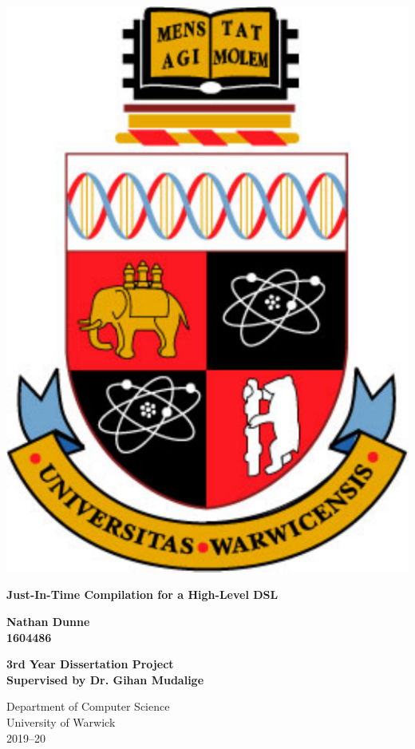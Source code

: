 
\thispagestyle{empty}

\begin{spacing}{2}
	\begin{center}
		\includegraphics[scale = 0.45]{Preamble/WarwickCrest.pdf}
	\end{center}
	\vspace{5mm}
	\begin{center}
		\textbf{\LARGE Just-In-Time Compilation for a High-Level DSL}
		\vspace{5mm}
	\end{center}
	\begin{center}
		\textbf{\Large Nathan Dunne}\\
		\textbf{\large 1604486}
		\vspace{20mm}
	\end{center}
	\begin{center}
		\textbf{\Large 3rd Year Dissertation Project}\\
		\textbf{\large Supervised by Dr. Gihan Mudalige}\\
		\vspace{20mm}
	\end{center}
	\begin{center}
		{\large Department of Computer Science}\\
		{\large University of Warwick}\\
		{\large 2019--20}
	\end{center}
\end{spacing}

